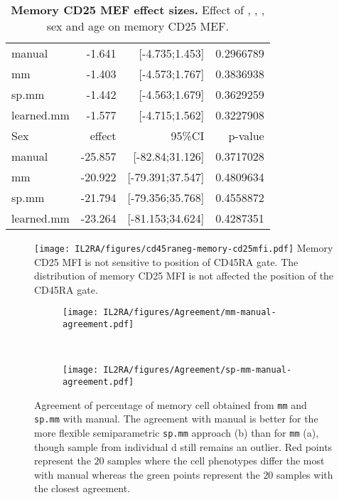 \begin{table}[h]
\begin{tabular}{lrrr}
manual     & -1.641 & [-4.735;1.453] & 0.2966789\\
mm         & -1.403 & [-4.573;1.767] & 0.3836938\\
sp.mm      & -1.442 & [-4.563;1.679] & 0.3629259\\
learned.mm & -1.577 & [-4.715;1.562] & 0.3227908\\
\rowcolor{Gray}
Sex        & effect  & 95\%CI           & p-value\\
manual     & -25.857 & [-82.84;31.126]  & 0.3717028\\
mm         & -20.922 & [-79.391;37.547] & 0.4809634\\
sp.mm      & -21.794 & [-79.356;35.768] & 0.4558872\\
learned.mm & -23.264 & [-81.153;34.624] & 0.4287351\\
\end{tabular}
\caption{
\label{table:memory-cell-mef-effect}
\textbf{Memory CD25 MEF effect sizes.}
Effect of , , , sex and age on memory CD25 MEF.
}
\end{table}

\begin{figure}[h]
  \texttt{[image: IL2RA/figures/cd45raneg-memory-cd25mfi.pdf]}
{ Memory CD25 MFI is not sensitive to position of CD45RA gate. }
{ The distribution of memory CD25 MFI is not affected the position of the CD45RA gate. }
\end{figure}


\begin{figure}[h]
    \begin{subfigure}[b]{.5\textwidth}
        \centering
        \texttt{[image: IL2RA/figures/Agreement/mm-manual-agreement.pdf]}
       \caption{ }
        \label{figure:mm-manual-agreement}
    \end{subfigure}
    ~
    \begin{subfigure}[b]{.5\textwidth}
       \texttt{[image: IL2RA/figures/Agreement/sp-mm-manual-agreement.pdf]}
       \caption{ }
        \label{figure:sp-mm-manual-agreement}
    \end{subfigure}
    {Agreement of percentage of memory cell obtained from \texttt{mm} and \texttt{sp.mm} with manual.}
    {
    The agreement with manual is better for the more flexible semiparametric \texttt{sp.mm} approach (b) than for \texttt{mm} (a),
    though sample from individual d still remains an outlier.
    Red points represent the $20$ samples where the cell phenotypes differ the most with manual 
    whereas the green points represent the $20$ samples with the closest agreement.
    }
\end{figure} 

